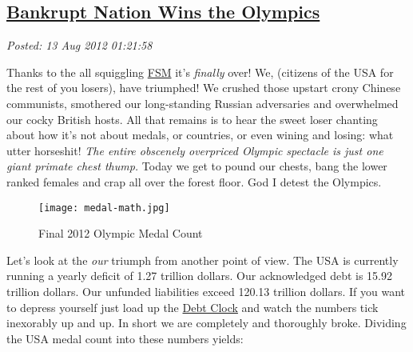 %

\subsection*{\href{https://bakerjd99.wordpress.com/2012/08/12/bankrupt-nation-wins-the-olympics/}{Bankrupt Nation Wins the Olympics}}


\noindent\emph{Posted: 13 Aug 2012 01:21:58}
\vspace{6pt}

Thanks to the all squiggling \href{http://www.venganza.org/}{FSM} it's
\emph{finally} over! We, (citizens of the USA for the rest of you
losers), have triumphed! We crushed those upstart crony Chinese
communists, smothered our long-standing Russian adversaries and
overwhelmed our cocky British hosts. All that remains is to hear the
sweet loser chanting about how it's not about medals, or countries, or
even wining and losing: what utter horseshit! \emph{The entire obscenely
overpriced Olympic spectacle is just one giant primate chest thump.}
Today we get to pound our chests, bang the lower ranked females and crap
all over the forest floor. God I detest the Olympics.



\captionsetup[figure]{labelformat=empty}
\begin{figure}[htbp]
\centering
\texttt{[image: medal-math.jpg]}
\caption{Final 2012 Olympic Medal Count}
\label{fig:3145X0}
\end{figure}

Let's look at the \emph{our} triumph from
another point of view. The USA is currently running a yearly deficit of
1.27 trillion dollars. Our acknowledged debt is 15.92 trillion dollars.
Our unfunded liabilities exceed 120.13 trillion dollars. If you want to
depress yourself just load up the
\href{http://www.usdebtclock.org/}{Debt Clock} and watch the numbers tick
inexorably up and up. In short we are completely and thoroughly broke.
Dividing the USA medal count into these numbers yields:

